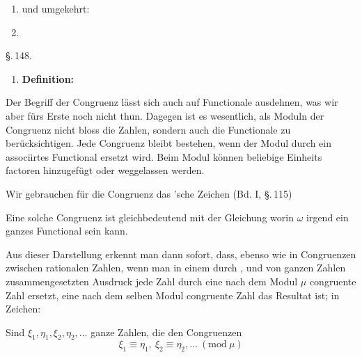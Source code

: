\begin{enumerate}
\item[] und umgekehrt:
\item[2.] 
\end{enumerate}

\S.\,148.


\begin{enumerate}
\item[1.] \textbf{Definition:} 
\end{enumerate}

Der Begriff der Congruenz lässt sich auch auf Functionale
ausdehnen, was wir aber fürs Erste noch nicht thun. Dagegen
ist es wesentlich, als Moduln der Congruenz nicht bloss die
Zahlen, sondern auch die Functionale zu berücksichtigen. Jede
Congruenz bleibt bestehen, wenn der Modul durch ein associirtes
Functional ersetzt wird. Beim Modul können beliebige Einheits\-
factoren hinzugefügt oder weggelassen werden.

Wir gebrauchen für die Congruenz das 'sche Zeichen
(Bd. I, \S.\,115)

Eine solche Congruenz ist gleichbedeutend mit der Gleichung
worin $\omega$ irgend ein ganzes Functional sein kann.

Aus dieser Darstellung erkennt man dann sofort, dass, ebenso
wie in Congruenzen zwischen rationalen Zahlen, wenn man in
einem durch ,  und  von
ganzen Zahlen zusammengesetzten Ausdruck jede Zahl durch
eine nach dem Modul $\mu$ congruente Zahl ersetzt, eine nach dem\-
selben Modul congruente Zahl das Resultat ist; in Zeichen:

Sind $\xi_1, \eta_1, \xi_2, \eta_2, \ldots$ ganze Zahlen, die den Congruenzen
\[
\xi_1 \equiv \eta_1, \ \xi_2 \equiv \eta_2, \ldots \ (\mathrm{mod}\ \mu)
\]
